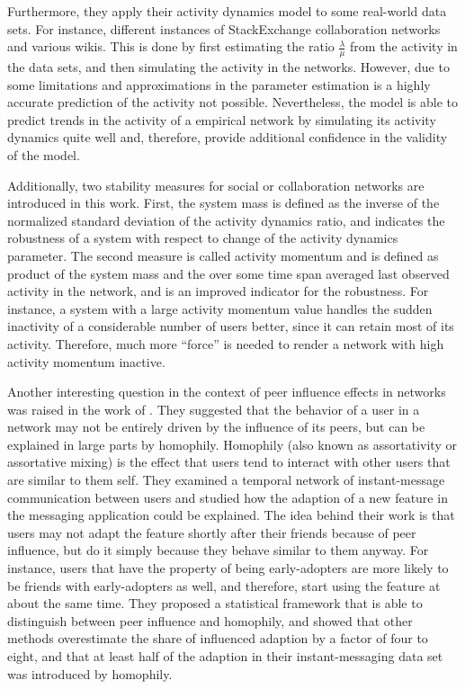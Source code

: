 Furthermore, they apply their activity dynamics model to some real-world data sets.
For instance, different instances of StackExchange collaboration networks and various wikis.
This is done by first estimating the ratio \( \frac{\lambda}{\mu} \) from the activity in the data sets, and then simulating the activity in the networks.
However, due to some limitations and approximations in the parameter estimation is a highly accurate prediction of the activity not possible.
Nevertheless, the model is able to predict trends in the activity of a empirical network by simulating its activity dynamics quite well and, therefore, provide additional confidence in the validity of the model.

Additionally, two stability measures for social or collaboration networks are introduced in this work.
First, the system mass is defined as the inverse of the normalized standard deviation of the activity dynamics ratio, and indicates the robustness of a system with respect to change of the activity dynamics parameter.
The second measure is called activity momentum and is defined as product of the system mass and the over some time span averaged last observed activity in the network, and is an improved indicator for the robustness.
For instance, a system with a large activity momentum value handles the sudden inactivity of a considerable number of users better, since it can retain most of its activity.
Therefore, much more \enquote{force} is needed to render a network with high activity momentum inactive.

Another interesting question in the context of peer influence effects in networks was raised in the work of \citet{Aral2009}.
They suggested that the behavior of a user in a network may not be entirely driven by the influence of its peers, but can be explained in large parts by homophily.
Homophily (also known as assortativity or assortative mixing) is the effect that users tend to interact with other users that are similar to them self.
They examined a temporal network of instant-message communication between users and studied how the adaption of a new feature in the messaging application could be explained.
The idea behind their work is that users may not adapt the feature shortly after their friends because of peer influence, but do it simply because they behave similar to them anyway.
For instance, users that have the property of being early-adopters are more likely to be friends with early-adopters as well, and therefore, start using the feature at about the same time.
They proposed a statistical framework that is able to distinguish between peer influence and homophily, and showed that other methods overestimate the share of influenced adaption by a factor of four to eight, and that at least half of the adaption in their instant-messaging data set was introduced by homophily.
